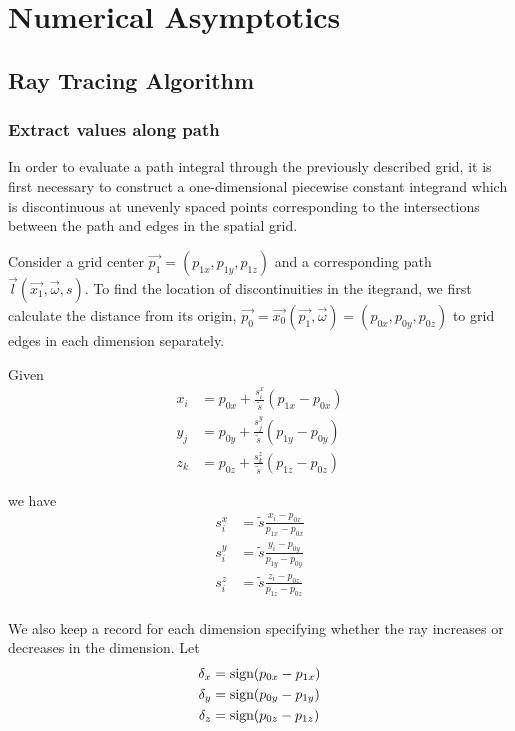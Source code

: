 \section{Numerical Asymptotics}

\subsection{Ray Tracing Algorithm}
\subsubsection{Extract values along path}

In order to evaluate a path integral through the previously described grid, it
is first necessary to construct a one-dimensional piecewise constant integrand
which is discontinuous at unevenly spaced points corresponding to the
intersections between the path and edges in the spatial grid.

Consider a grid center $\vec{p_1} = (p_{1x},p_{1y},p_{1z})$ and a corresponding path $\vec{l}(\vec{x_1}, \vec{\omega}, s)$.
To find the location of discontinuities in the itegrand, we first calculate the
distance from its origin, $\vec{p_0} = \vec{x_0}(\vec{p_1}, \vec{\omega}) = (p_{0x}, p_{0y}, p_{0z})$ to grid edges in each dimension
separately.

Given
\begin{align}
  x_i &= p_{0x} + \frac{s_i^x}{\tilde{s}}(p_{1x}-p_{0x}) \\
  y_j &= p_{0y} + \frac{s_j^y}{\tilde{s}}(p_{1y}-p_{0y}) \\
  z_k &= p_{0z} + \frac{s_k^z}{\tilde{s}}(p_{1z}-p_{0z})
\end{align}

we have
\begin{align}
  s_i^x &= \tilde{s}\frac{x_i-p_{0x}}{p_{1x}-p_{0x}} \\
  s_i^y &= \tilde{s}\frac{y_i-p_{0y}}{p_{1y}-p_{0y}} \\
  s_i^z &= \tilde{s}\frac{z_i-p_{0z}}{p_{1z}-p_{0z}} \\
\end{align}


We also keep a record for each dimension specifying whether the ray increases
or decreases in the dimension. Let
\begin{align}
  \delta_x &= \mbox{sign}(p_{0x}-p_{1x}) \\
  \delta_y &= \mbox{sign}(p_{0y}-p_{1y}) \\
  \delta_z &= \mbox{sign}(p_{0z}-p_{1z})
\end{align}

